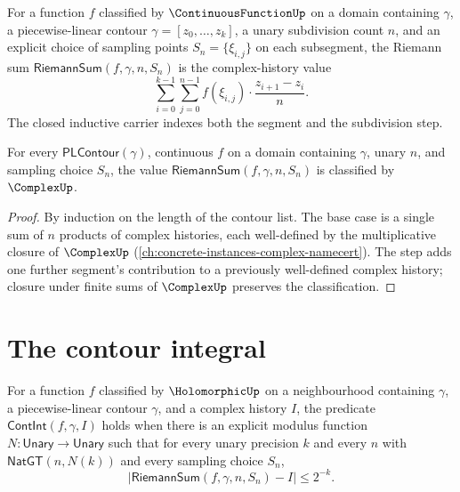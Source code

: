 \begin{definition}
\label{def:riemann-sum}
For a function \(f\) classified by \(\ContinuousFunctionUp\) on a domain containing \(\gamma\), a piecewise-linear contour \(\gamma = [z_0, \ldots, z_k]\), a unary subdivision count \(n\), and an explicit choice of sampling points \(S_n = \{\xi_{i,j}\}\) on each subsegment, the Riemann sum \(\mathsf{RiemannSum}(f, \gamma, n, S_n)\) is the complex-history value
$$
\sum_{i=0}^{k-1} \sum_{j=0}^{n-1} f(\xi_{i,j}) \cdot \frac{z_{i+1} - z_i}{n}.
$$
The closed inductive carrier indexes both the segment and the subdivision step.
\end{definition}

\begin{lemma}
\label{lem:riemann-sum-complex}
For every \(\mathsf{PLContour}(\gamma)\), continuous \(f\) on a domain containing \(\gamma\), unary \(n\), and sampling choice \(S_n\), the value \(\mathsf{RiemannSum}(f, \gamma, n, S_n)\) is classified by \(\ComplexUp\).
\end{lemma}
\begin{proof}
By induction on the length of the contour list. The base case is a single sum of \(n\) products of complex histories, each well-defined by the multiplicative closure of \(\ComplexUp\) (\autoref{ch:concrete-instances-complex-namecert}). The step adds one further segment's contribution to a previously well-defined complex history; closure under finite sums of \(\ComplexUp\) preserves the classification.
\end{proof}

\section{The contour integral}

\begin{definition}
\label{def:cont-int}
For a function \(f\) classified by \(\HolomorphicUp\) on a neighbourhood containing \(\gamma\), a piecewise-linear contour \(\gamma\), and a complex history \(I\), the predicate \(\mathsf{ContInt}(f, \gamma, I)\) holds when there is an explicit modulus function \(N : \mathsf{Unary} \to \mathsf{Unary}\) such that for every unary precision \(k\) and every \(n\) with \(\mathsf{NatGT}(n, N(k))\) and every sampling choice \(S_n\),
$$
\bigl| \mathsf{RiemannSum}(f, \gamma, n, S_n) - I \bigr| \leq 2^{-k}.
$$
\end{definition}

